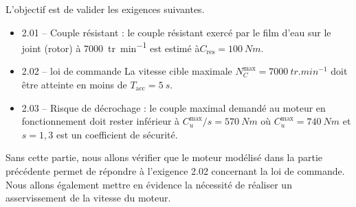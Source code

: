 \normalfalse \difficiletrue \tdifficilefalse
\correctionfalse



\setcounter{question}{0}
\ifcorrection
\else
{}
\fi

\ifprof
\else


\begin{obj}
L'objectif est de valider les exigences suivantes.
\begin{itemize}
\item 2.01 -- Couple résistant : le couple résistant exercé par le film d’eau sur le joint (rotor) à \SI{7 000}{tr.min^{-1}} est estimé à$C_{\text{res}} = \SI{100}{N}{m}$. 
\item 2.02 -- loi de commande La vitesse cible maximale $N^{\text{max}}_C = \SI{7 000}{tr.min^{-1}}$ doit être atteinte en moins de $T_{\text{acc}} = \SI{5}{s}$.
\item 2.03 -- Risque de décrochage : le couple maximal demandé au moteur en fonctionnement doit
rester inférieur à $C^{\text{max}}_u /s = \SI{570}{Nm}$ où $C^{\text{max}}_u = \SI{740}{Nm}$ et
$s = 1,3$ est un coefficient de sécurité.
\end{itemize}

Sans cette partie, nous allons vérifier que le moteur modélisé dans la partie
précédente permet de répondre à l’exigence 2.02 concernant la loi de commande. Nous
allons également mettre en évidence la nécessité de réaliser un asservissement de la vitesse
du moteur.
\end{obj}

